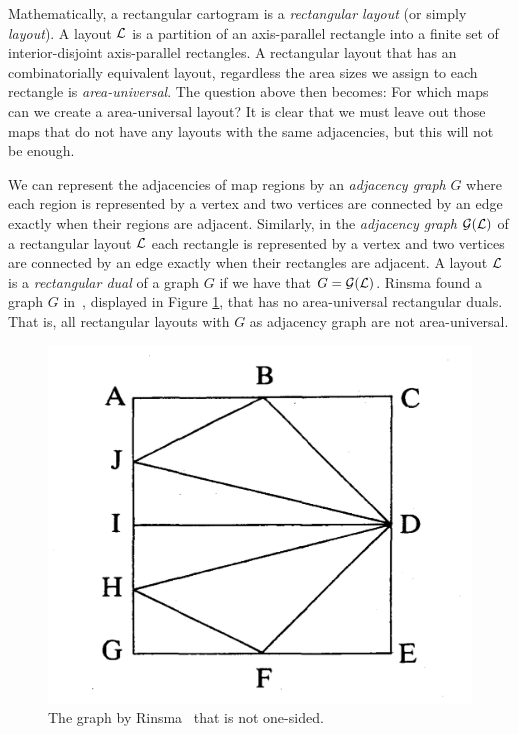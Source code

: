   Mathematically, a rectangular cartogram is a  \emph{rectangular layout} (or simply \emph{layout}).
  A layout $\mathcal{L}$ is a partition of an axis-parallel rectangle into a finite set of interior-disjoint axis-parallel rectangles.
  A rectangular layout that has an combinatorially equivalent layout, regardless the area sizes we assign to each rectangle is \emph{area-universal}.
  The question above then becomes: For which maps can we create a area-universal layout?
  It is clear that we must leave out those maps that do not have any layouts with the same adjacencies, but this will not be enough.

  We can represent the adjacencies of map regions by an \emph{adjacency graph} $G$ where each region is represented by a vertex and two vertices are connected by an edge exactly when their regions are adjacent.
  Similarly, in the \emph{adjacency graph} $\mathcal{G}(\mathcal{L})$ of a rectangular layout $\mathcal{L}$ each rectangle is represented by a vertex and two vertices are connected by an edge exactly when their rectangles are adjacent.
  A layout $\mathcal{L}$ is a \emph{rectangular dual} of a graph $G$ if we have that $G = \mathcal{G}(\mathcal{L})$.
  Rinsma found a graph $G$ in~\cite{Rinsma1987}, displayed in Figure \ref{fig:intro:rinsma}, that has no area-universal rectangular duals.
  That is, all rectangular layouts with $G$ as adjacency graph are not area-universal.

  \begin{figure}
    \includegraphics[scale=.15]{introduction/img/rinsma.png}
    \caption{The graph by Rinsma~\cite{Rinsma1987} that is not one-sided.}
    \label{fig:intro:rinsma}
  \end{figure}


